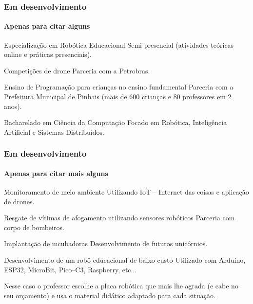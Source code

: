 \documentclass{beamer}
\begin{document}
\begin{frame}
	\frametitle{Em desenvolvimento}
	\framesubtitle{Apenas para citar alguns}
	\begin{block}{Especialização em Robótica Educacional}
		Semi-presencial (atividades teóricas online e práticas presenciais).
	\end{block}

	\begin{block}{Competições de drone}
		Parceria com a Petrobras.
	\end{block}

	\begin{block}{Ensino de Programação para crianças no ensino fundamental}
		Parceria com a Prefeitura Municipal de Pinhais (mais de 600 crianças e 80 professores em 2 anos).
	\end{block}

	\begin{block}{Bacharelado em Ciência da Computação}
		Focado em Robótica, Inteligência Artificial e Sistemas Distribuídos.
	\end{block}

\end{frame}

\begin{frame}
	\frametitle{Em desenvolvimento}
	\framesubtitle{Apenas para citar mais alguns}
	\begin{block}{Monitoramento de meio ambiente}
		Utilizando IoT -- Internet das coisas e aplicação de drones.
	\end{block}

	\begin{block}{Resgate de vítimas de afogamento utilizando sensores robóticos}
		Parceria com corpo de bombeiros.
	\end{block}

	\begin{block}{Implantação de incubadoras}
		Desenvolvimento de futuros unicórnios.
	\end{block}

	\begin{block}{Desenvolvimento de um robô educacional de baixo custo}
		Utilizado com Arduíno, ESP32, MicroBit, Pico--C3, Raspberry, etc$\dots$
		
		Nesse caso o professor escolhe a placa robótica que mais lhe agrada (e cabe no seu orçamento) e usa o material didático adaptado para cada situação.
		\end{block}
\end{frame}
\end{document}
